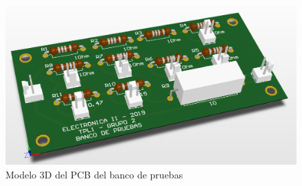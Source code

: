 \begin{figure}[!h]
\begin{centering}
\includegraphics[scale=0.45]{Imagenes/Banco3D.png}
\par\end{centering}
\caption{Modelo 3D del PCB del banco de pruebas}

\end{figure}

